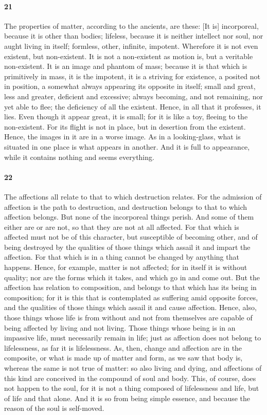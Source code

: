 \documentclass[12pt]{article}
\begin{document}
\paragraph{21} The properties of matter, according to the ancients, are these:
[It is] incorporeal, because it is other than bodies; lifeless, because it is
neither intellect nor soul, nor aught living in itself; formless, other,
infinite, impotent. Wherefore it is not even existent, but non-existent. It is
not a non-existent as motion is, but a veritable non-existent. It is an image
and phantom of mass; because it is that which is primitively in mass, it is the
impotent, it is a striving for existence, a posited not in position, a somewhat
always appearing its opposite in itself; small and great, less and greater,
deficient and excessive; always becoming, and not remaining, nor yet able to
flee; the deficiency of all the existent. Hence, in all that it professes, it
lies. Even though it appear great, it is small; for it is like a toy, fleeing
to the non-existent. For its flight is not in place, but in desertion from the
existent. Hence, the images in it are in a worse image. As in a looking-glass,
what is situated in one place is what appears in another. And it is full to
appearance, while it contains nothing and seems everything.

\paragraph{22} The affections all relate to that to which destruction relates.
For the admission of affection is the path to destruction, and destruction
belongs to that to which affection belongs. But none of the incorporeal things
perish. And some of them either are or are not, so that they are not at all
affected. For that which is affected must not be of this character, but
susceptible of becoming other, and of being destroyed by the qualities of those
things which assail it and impart the affection. For that which is in a thing
cannot be changed by anything that happens. Hence, for example, matter is not
affected; for in itself it is without quality; nor are the forms which it
takes, and which go in and come out. But the affection has relation to
composition, and belongs to that which has its being in composition; for it is
this that is contemplated as suffering amid opposite forces, and the qualities
of those things which assail it and cause affection. Hence, also, those things
whose life is from without and not from themselves are capable of being
affected by living and not living. Those things whose being is in an impassive
life, must necessarily remain in life; just as affection does not belong to
lifelessness, as far it is lifelessness. As, then, change and affection are in
the composite, or what is made up of matter and form, as we saw that body is,
whereas the same is not true of matter: so also living and dying, and
affections of this kind are conceived in the compound of soul and body. This,
of course, does not happen to the soul, for it is not a thing composed of
lifelessness and life, but of life and that alone. And it is so from being
simple es\-sence, and because the reason of the soul is self-moved.
\end{document}
